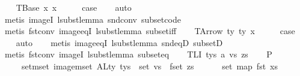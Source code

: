 \begin{isabellebody}
\ \ \isamarkupfalse%
\ {\isacharparenleft}{\kern0pt}TBase\ x{}\ x{}{\isacharparenright}{\kern0pt}\isanewline
\ \ \isamarkupfalse%
\ \isamarkupfalse%
\ {\isacharquery}{\kern0pt}case\isanewline
\ \ \isamarkupfalse%
\ auto\isanewline
\ \ \isamarkupfalse%
\ {\isacharparenleft}{\kern0pt}metis\ imageI\ lsubst{\isacharunderscore}{\kern0pt}lemma{}\ snd{\isacharunderscore}{\kern0pt}conv\ subset{\isacharunderscore}{\kern0pt}code{\isacharparenleft}{\kern0pt}{}{\isacharparenright}{\kern0pt}{\isacharparenright}{\kern0pt}\isanewline
\ \ \isamarkupfalse%
\ {\isacharparenleft}{\kern0pt}metis\ fst{\isacharunderscore}{\kern0pt}conv\ image{\isacharunderscore}{\kern0pt}eqI\ lsubst{\isacharunderscore}{\kern0pt}lemma{}\ subset{\isacharunderscore}{\kern0pt}iff{\isacharparenright}{\kern0pt}\isanewline
{}\isamarkupfalse%
\isanewline
\ \ \isamarkupfalse%
\ {\isacharparenleft}{\kern0pt}TArrow\ ty{}\ ty{}\ x{}{\isacharparenright}{\kern0pt}\isanewline
\ \ \isamarkupfalse%
\ \isamarkupfalse%
\ {\isacharquery}{\kern0pt}case\isanewline
\ \ \isamarkupfalse%
\ auto\isanewline
\ \ \isamarkupfalse%
\ {\isacharparenleft}{\kern0pt}metis\ image{\isacharunderscore}{\kern0pt}eqI\ lsubst{\isacharunderscore}{\kern0pt}lemma{}\ snd{\isacharunderscore}{\kern0pt}eqD\ subsetD{\isacharparenright}{\kern0pt}\isanewline
\ \ \isamarkupfalse%
\ {\isacharparenleft}{\kern0pt}metis\ fst{\isacharunderscore}{\kern0pt}conv\ imageI\ lsubst{\isacharunderscore}{\kern0pt}lemma{}\ subset{\isacharunderscore}{\kern0pt}eq{\isacharparenright}{\kern0pt}\isanewline
{}\isamarkupfalse%
\isanewline
\ \ \isamarkupfalse%
\ {\isacharparenleft}{\kern0pt}TLI\ tys\ a\ vs\ zs{\isacharparenright}{\kern0pt}\isanewline
\ \ \isamarkupfalse%
\ P{}{\isacharcolon}{\kern0pt}\isanewline
\ \ \ \ {\isachardoublequoteopen}{\isasymUnion}\ {\isacharparenleft}{\kern0pt}set{\isacharunderscore}{\kern0pt}mset\ {\isacharparenleft}{\kern0pt}image{\isacharunderscore}{\kern0pt}mset\ ALty\ tys{\isacharparenright}{\kern0pt}{\isacharparenright}{\kern0pt}\ {\isasymunion}\ set\ vs\ {\isasymunion}\ fset\ zs\isanewline
\ \ \ \ \ {\isacharequal}{\kern0pt}\ set\ {\isacharparenleft}{\kern0pt}map\ fst\ xs{\isacharparenright}{\kern0pt}{\isachardoublequoteclose}\isanewline

\end{isabellebody}
